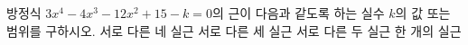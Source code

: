 방정식 $3x^4-4x^3-12x^2+15-k=0$의 근이 다음과 같도록 하는 실수 $k$의 값 또는 범위를 구하시오.
 서로 다른 네 실근
 서로 다른 세 실근
 서로 다른 두 실근
 한 개의 실근
